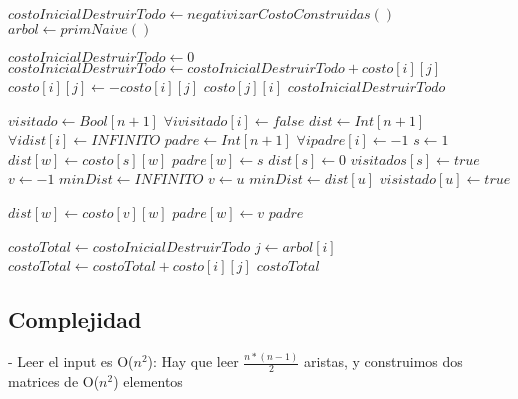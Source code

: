\begin{algorithm}
\label{ej3}         %
\begin{algorithmic}
	\State $costoInicialDestruirTodo \gets negativizarCostoConstruidas()$
	\State $arbol \gets primNaive()$
	\State \Return {}
\EndFunction

	\State $costoInicialDestruirTodo \gets 0$
	\For{$i \in [0..n)$}
				\State $costoInicialDestruirTodo \gets costoInicialDestruirTodo + costo[i][j]$
				\State $costo[i][j] \gets -costo[i][j]$
				\State $costo[j][i]$
			\EndIf
		\EndFor
	\EndFor
	\State \Return $costoInicialDestruirTodo$
\EndFunction

	\State $visitado \gets Bool[n+1]$
	\State $\forall i visitado[i] \gets false$
	\State $dist \gets Int[n+1]$
	\State $\forall i dist[i] \gets INFINITO$
	\State $padre \gets Int[n+1]$
	\State $\forall i padre[i] \gets -1$
	\State $s \gets 1$
			\State $dist[w] \gets costo[s][w]$
			\State $padre[w] \gets s$
		\EndIf
	\EndFor
	\State $dist[s] \gets 0$
	\State $visitados[s] \gets true$
		\State $v \gets -1$
		\State $minDist \gets INFINITO$
				\State $v \gets u$
				\State $minDist \gets dist[u]$
			\EndIf
		\EndFor
		\State $visistado[u] \gets true$

				\State $dist[w] \gets costo[v][w]$
				\State $padre[w] \gets v$
			\EndIf
		\EndFor
	\EndFor
	\State \Return $padre$
\EndFunction

	\State $costoTotal \gets costoInicialDestruirTodo$
		\State $j \gets arbol[i]$
		\State $costoTotal \gets costoTotal + costo[i][j]$
	\EndFor
	\State \Return $costoTotal$
\EndFunction
\end{algorithmic}
\end{algorithm}

\newpage
\subsection{Complejidad}

- Leer el input es O($n^2$): Hay que leer $\frac{n*(n-1)}{2}$ aristas, y construimos dos matrices de O($n^2$) elementos \\

